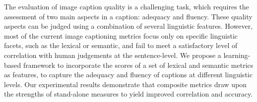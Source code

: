 The evaluation of image caption quality is a challenging task, which requires the assessment of two main aspects in a caption: adequacy and fluency. These quality aspects can be judged using a combination of several linguistic features. However, most of the current image captioning metrics focus only on specific linguistic facets, such as the lexical or semantic, and fail to meet a satisfactory level of correlation with human judgements at the sentence-level. We propose a learning-based framework to incorporate the scores of a set of lexical and semantic metrics as features, to capture the adequacy and fluency of captions at different linguistic levels. Our experimental results demonstrate that composite metrics draw upon the strengths of stand-alone measures to yield improved correlation and accuracy.
